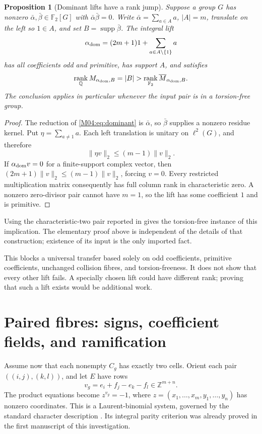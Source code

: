 \documentclass[11pt,a4paper,oneside]{report}
\newtheorem{proposition}[theorem]{Proposition}
\theoremstyle{definition}
\theoremstyle{remark}
\DeclareMathOperator{\supp}{supp}
\DeclareMathOperator{\rank}{rank}
\newcommand{\Q}{\mathbb Q}
\newcommand{\Z}{\mathbb Z}
\newcommand{\F}{\mathbb F}
\begin{document}
\begin{proposition}[Dominant lifts have a rank jump]\label{M04:prop:dominant}
Suppose a group $G$ has nonzero
$\bar\alpha,\bar\beta\in\F_2[G]$ with
$\bar\alpha\bar\beta=0$. Write
$\bar\alpha=\sum_{a\in A}a$, $|A|=m$, translate on the left so
$1\in A$, and set $B=\supp\bar\beta$. The integral lift
\begin{equation}\label{M04:eq:dominant}
\alpha_{\rm dom}=(2m+1)1+\sum_{a\in A\setminus\{1\}}a
\end{equation}
has all coefficients odd and primitive, has support $A$, and satisfies
\[
\rank_{\Q}M_{\alpha_{\rm dom},B}=|B|
>\rank_{\F_2}\overline M_{\alpha_{\rm dom},B}.
\]
The conclusion applies in particular whenever the input pair is in a
torsion-free group.
\end{proposition}
\begin{proof}
The reduction of \eqref{M04:eq:dominant} is $\bar\alpha$, so
$\bar\beta$ supplies a nonzero residue kernel. Put
$\eta=\sum_{a\ne1}a$. Each left translation is unitary on
$\ell^2(G)$, and therefore
\[
\|\eta v\|_2\le(m-1)\|v\|_2.
\]
If $\alpha_{\rm dom}v=0$ for a finite-support complex vector, then
$(2m+1)\|v\|_2\le(m-1)\|v\|_2$, forcing $v=0$.
Every restricted multiplication matrix consequently has full column
rank in characteristic zero. A nonzero zero-divisor pair cannot have
$m=1$, so the lift has some coefficient $1$ and is primitive.
\end{proof}

Using the characteristic-two pair reported in \cite{B:OpenAI} gives the
torsion-free instance of this implication. The elementary proof above
is independent of the details of that construction; existence of its
input is the only imported fact.

This blocks a universal transfer based solely on odd coefficients,
primitive coefficients, unchanged collision fibres, and torsion-freeness.
It does not show that every other lift fails. A specially chosen lift
could have different rank; proving that such a lift exists would be
additional work.

\section{Paired fibres: signs, coefficient fields, and ramification}

Assume now that each nonempty $C_g$ has exactly two cells. Orient each
pair $((i,j),(k,l))$, and let $E$ have rows
\[
v_g=e_i+f_j-e_k-f_l\in\Z^{m+n}.
\]
The product equations become $z^{v_g}=-1$, where
$z=(x_1,\ldots,x_m,y_1,\ldots,y_n)$ has nonzero coordinates.
This is a Laurent-binomial system, governed by the standard character
description \cite[Theorem 2.1]{B:ES}. Its integral parity criterion was
already proved in the first manuscript of this investigation.
\end{document}
